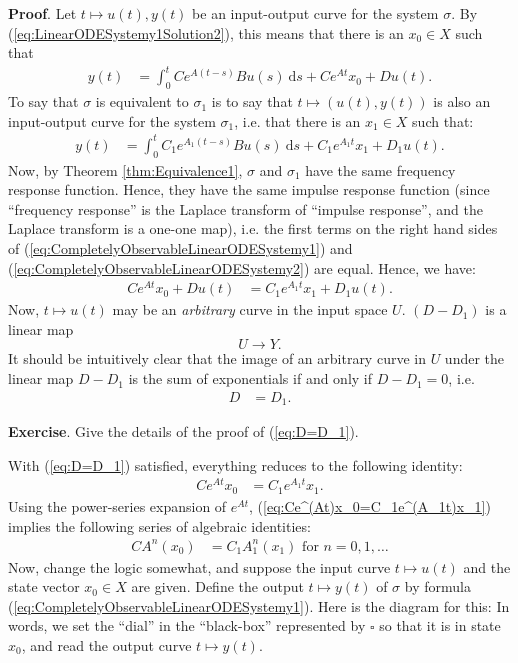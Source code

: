 \documentclass[12pt]{book}
\theoremstyle{plain}
\theoremstyle{definition}
\newcommand{\dd}[1]{\mathrm{d}#1}
\begin{document}
\textbf{Proof}.
Let $t \mapsto u(t), y(t)$ be an input-output curve for the system $\sigma$.
By (\ref{eq:LinearODESystemy1Solution2}), this means that there is an $x_0 \in X$ such that
\begin{align} \label{eq:CompletelyObservableLinearODESystemy1}
    y(t) &= \int_0^t Ce^{A(t-s)}Bu(s)\ \dd{s} + Ce^{At}x_0 + Du(t).
\end{align}
To say that $\sigma$ is equivalent to $\sigma_1$ is to say that $t \mapsto (u(t), y(t))$ is also an input-output curve for the system $\sigma_1$, i.e. that there is an $x_1 \in X$ such that:
\begin{align} \label{eq:CompletelyObservableLinearODESystemy2}
    y(t) &= \int_0^t C_1e^{A_1(t-s)}Bu(s)\ \dd{s} + C_1e^{A_1t}x_1 + D_1u(t).
\end{align}
Now, by Theorem \ref{thm:Equivalence1}, $\sigma$ and $\sigma_1$ have the same frequency response function.
Hence, they have the same impulse response function (since ``frequency response'' is the Laplace transform of ``impulse response'', and the Laplace transform is a one-one map), i.e. the first terms on the right hand sides of (\ref{eq:CompletelyObservableLinearODESystemy1}) and (\ref{eq:CompletelyObservableLinearODESystemy2}) are equal.
Hence, we have:
\begin{align}
    Ce^{At}x_0 + Du(t) &= C_1e^{A_1t}x_1 + D_1u(t).
\end{align}
Now, $t \mapsto u(t)$ may be an \emph{arbitrary} curve in the input space $U$. $(D-D_1)$ is a linear map
$$U \to Y.$$
It should be intuitively clear that the image of an arbitrary curve in $U$ under the linear map $D-D_1$ is the sum of exponentials if and only if $D-D_1=0$, i.e.
\begin{align} \label{eq:D=D_1}
    D &= D_1.
\end{align}

\textbf{Exercise}.
Give the details of the proof of (\ref{eq:D=D_1}).

With (\ref{eq:D=D_1}) satisfied, everything reduces to the following identity:
\begin{align} \label{eq:Ce^(At)x_0=C_1e^(A_1t)x_1}
    Ce^{At}x_0 &= C_1e^{A_1t}x_1.
\end{align}
Using the power-series expansion of $e^{At}$, (\ref{eq:Ce^(At)x_0=C_1e^(A_1t)x_1}) implies the following series of algebraic identities:
\begin{align} \label{eq:AlgebraicIdentities1}
    CA^n(x_0) &= C_1A_1^n(x_1) \text{ for } n = 0, 1, \dots
\end{align}
Now, change the logic somewhat, and suppose the input curve $t \mapsto u(t)$ and the state vector $x_0 \in X$ are given.
Define the output $t \mapsto y(t)$ of $\sigma$ by formula (\ref{eq:CompletelyObservableLinearODESystemy1}).
Here is the diagram for this:
In words, we set the ``dial'' in the ``black-box'' represented by $\square$ so that it is in state $x_0$, and read the output curve $t \mapsto y(t)$.
\end{document}
